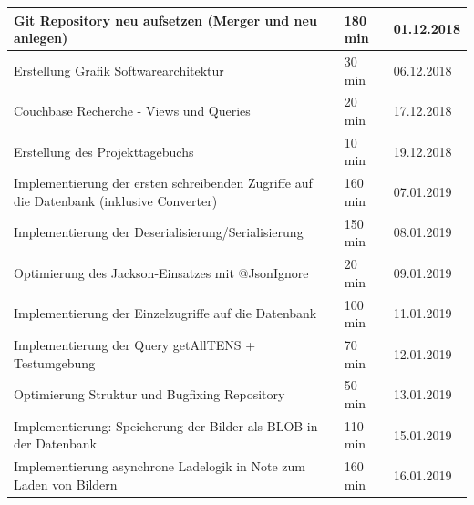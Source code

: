 \begin{longtable}{|p{10cm}|p{2cm}|p{2cm}|}
		Git Repository neu aufsetzen (Merger und neu anlegen)                                    & 180 min                               & 01.12.2018                            \\ \hline
		Erstellung Grafik Softwarearchitektur                                                    & 30 min                                & 06.12.2018                            \\ \hline
		Couchbase Recherche - Views und Queries                                                  & 20 min                                & 17.12.2018                            \\ \hline
		Erstellung des Projekttagebuchs                                                          & 10 min                                & 19.12.2018                            \\ \hline
		Implementierung der ersten schreibenden Zugriffe auf die Datenbank (inklusive Converter) & 160 min                               & 07.01.2019                            \\ \hline
		Implementierung der Deserialisierung/Serialisierung                                      & 150 min                               & 08.01.2019                            \\ \hline
		Optimierung des Jackson-Einsatzes mit @JsonIgnore                                        & 20 min                                & 09.01.2019                            \\ \hline
		Implementierung der Einzelzugriffe auf die Datenbank                                     & 100 min                               & 11.01.2019                            \\ \hline
		Implementierung der Query getAllTENS + Testumgebung                                      & 70 min                                & 12.01.2019                            \\ \hline
		Optimierung Struktur und Bugfixing Repository                                            & 50 min                                & 13.01.2019                            \\ \hline
		Implementierung: Speicherung der Bilder als BLOB in der Datenbank                        & 110 min                               & 15.01.2019                            \\ \hline
		Implementierung asynchrone Ladelogik in Note zum Laden von Bildern                       & 160 min                               & 16.01.2019                            \\ \hline

\end{longtable}
